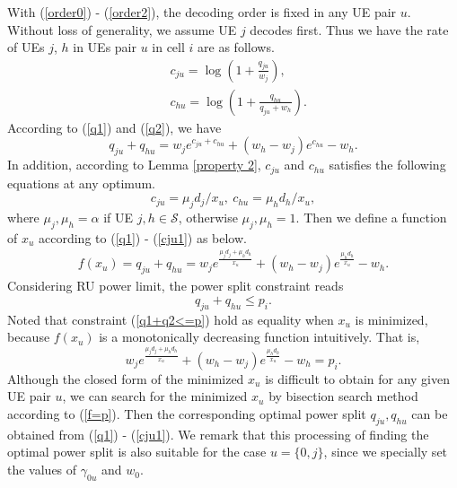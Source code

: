 \documentclass[10pt,journal,final,finalsubmission,twocolumn]{IEEEtran}
\begin{document}
With (\ref{order0}) - (\ref{order2}), the decoding order is fixed in any UE pair $u$. Without loss of generality, we assume UE $j$ decodes first. Thus we have the rate of UEs $j$, $h$ in UEs pair $u$ in cell $i$ are as follows.
\begin{align}
&c_{ju} = \log(1+\frac{q_{ju}}{w_j}),\label{q1}\\
&c_{hu} = \log(1+\frac{q_{hu}}{q_{ju}+w_h}).\label{q2}
\end{align}
According to (\ref{q1}) and (\ref{q2}), we have 
\begin{equation}
q_{ju} + q_{hu} = w_j e^{c_{ju}+c_{hu}}+(w_h-w_j) e^{c_{hu}}-w_h.
\end{equation}
 In addition, according to Lemma \ref{property 2}, $c_{ju}$ and $c_{hu}$ satisfies the following equations at any optimum.
\begin{equation}\label{cju1}
c_{ju} = {\mu_j d_j}/{x_u},\ c_{hu} = {\mu_h d_h}/{x_u},
\end{equation}
where $\mu_j,\mu_h = \alpha$ if UE $j, h\in \mathcal{S}$, otherwise $\mu_j,\mu_h = 1$. Then we define a function of $x_u$ according to (\ref{q1}) - (\ref{cju1}) as below.
 \begin{align}
 f(x_u) \!=\! q_{ju}\!+\!q_{hu}\! = \!w_je^{\frac{\mu_j d_j+\mu_h d_h}{x_u}}\!+\!(w_h\!-\!w_j)e^{\frac{\mu_h d_h}{x_u}}\!-\!w_h.\label{q1+q2}
 \end{align} 
Considering RU power limit, the power split constraint reads
\begin{equation}\label{q1+q2<=p}
q_{ju}+q_{hu} \leq p_i.
\end{equation}
Noted that constraint (\ref{q1+q2<=p}) hold as equality when $x_u$ is minimized, because $f(x_u)$ is a monotonically decreasing function intuitively. That is,
 \begin{equation}\label{f=p}
w_je^{\frac{\mu_j d_j+\mu_h d_h}{x_u}}+(w_h-w_j)e^{\frac{\mu_h d_h}{x_u}}-w_h= p_i.
 \end{equation}
Although the closed form of the minimized $x_u$ is difficult to obtain for any given UE pair $u$, we can search for the minimized $x_u$ by bisection search method according to (\ref{f=p}). Then the corresponding optimal power split $q_{ju},q_{hu}$ can be obtained from (\ref{q1}) - (\ref{cju1}). We remark that this processing of finding the optimal power split is also suitable for the case $u=\{0,j\}$, since we specially set the values of $\gamma_{0u}$ and $w_0$.
 
\end{document}
